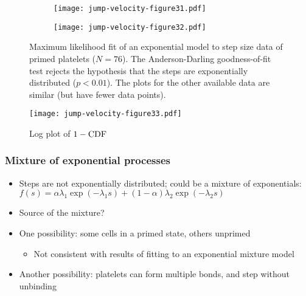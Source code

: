 \documentclass{beamer}
\newcommand{\tn}{\textnormal}
\begin{document}
\begin{frame}
  \begin{figure}
    \centering
    \begin{subfigure}{0.48\textwidth}
      \texttt{[image: jump-velocity-figure31.pdf]}
    \end{subfigure}
    \hfill
    \begin{subfigure}{0.48\textwidth}
      \texttt{[image: jump-velocity-figure32.pdf]}
    \end{subfigure}
    \caption{Maximum likelihood fit of an exponential model to step
      size data of primed platelets ($N=76$). The Anderson-Darling
      goodness-of-fit test rejects the hypothesis that the steps are
      exponentially distributed ($p < 0.01$). The plots for the other
      available data are similar (but have fewer data points).}
    \label{fig:step-fit}
  \end{figure}
\end{frame}

\begin{frame}
  \begin{figure}
    \centering
    \texttt{[image: jump-velocity-figure33.pdf]}
    \caption{Log plot of $1 - \tn{CDF}$}
    \label{fig:log-cdf}
  \end{figure}
\end{frame}

\begin{frame}
  \frametitle{Mixture of exponential processes}
  \begin{itemize}
  \item Steps are not exponentially distributed; could be a mixture of
    exponentials: $f(s) = \alpha\lambda_1\exp(-\lambda_1 s) + (1 -
    \alpha)\lambda_2\exp(-\lambda_2 s)$
  \item Source of the mixture?
  \item One possibility: some cells in a primed state, others unprimed
    \begin{itemize}
    \item Not consistent with results of fitting to an exponential
      mixture model
    \end{itemize}
  \item Another possibility: platelets can form multiple bonds, and
    step without unbinding
  \end{itemize}
\end{frame}
\end{document}
